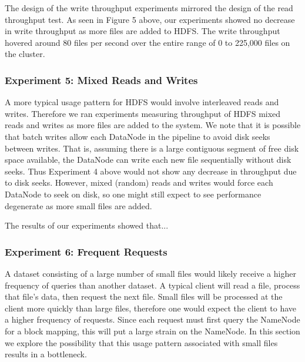 \documentclass[11pt, a4paper]{article}
\begin{document}
\begin{multicols*}{2}
The design of the write throughput experiments mirrored the design of the read throughput test. As seen in Figure 5 above, our experiments showed no decrease in write throughput as more files are added to HDFS. The write throughput hovered around 80 files per second over the entire range of 0 to 225,000 files on the cluster.

\subsubsection{Experiment 5: Mixed Reads and Writes}\label{ReadWriteThroughput}
A more typical usage pattern for HDFS would involve interleaved reads and writes. Therefore we ran experiments measuring throughput of HDFS mixed reads and writes as more files are added to the system. We note that it is possible that batch writes allow each DataNode in the pipeline to avoid disk seeks between writes. That is, assuming there is a large contiguous segment of free disk space available, the DataNode can write each new file sequentially without disk seeks. Thus Experiment 4 above would not show any decrease in throughput due to disk seeks. However, mixed (random) reads and writes would force each DataNode to seek on disk, so one might still expect to see performance degenerate as more small files are added.

The results of our experiments showed that...

\subsubsection{Experiment 6: Frequent Requests}\label{HighFrequencyRequests}
A dataset consisting of a large number of small files would likely receive a higher frequency of queries than another dataset. A typical client will read a file, process that file's data, then request the next file. Small files will be processed at the client more quickly than large files, therefore one would expect the client to have a higher frequency of requests. Since each request must first query the NameNode for a block mapping, this will put a large strain on the NameNode. In this section we explore the possibility that this usage pattern associated with small files results in a bottleneck.


\end{multicols*}
\end{document}
